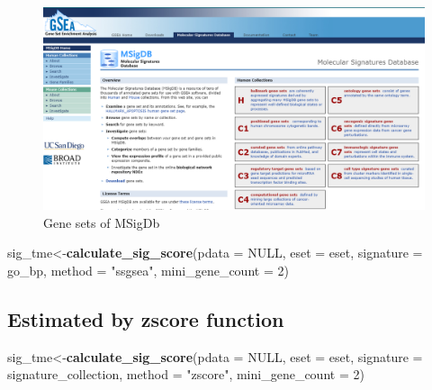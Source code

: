 \documentclass[
  12pt,
]{book}
\newenvironment{Shaded}{\begin{snugshade}}{\end{snugshade}}
\newcommand{\AttributeTok}[1]{\textcolor[rgb]{0.13,0.29,0.53}{#1}}
\newcommand{\ConstantTok}[1]{\textcolor[rgb]{0.56,0.35,0.01}{#1}}
\newcommand{\DecValTok}[1]{\textcolor[rgb]{0.00,0.00,0.81}{#1}}
\newcommand{\FunctionTok}[1]{\textcolor[rgb]{0.13,0.29,0.53}{\textbf{#1}}}
\newcommand{\NormalTok}[1]{#1}
\newcommand{\OtherTok}[1]{\textcolor[rgb]{0.56,0.35,0.01}{#1}}
\newcommand{\StringTok}[1]{\textcolor[rgb]{0.31,0.60,0.02}{#1}}
\begin{document}
\begin{figure}

{\centering \includegraphics[width=0.95\linewidth]{./fig/gsea} 

}

\caption{Gene sets of MSigDb}\label{fig:unnamed-chunk-10}
\end{figure}

\begin{Shaded}
\begin{Highlighting}[]
\NormalTok{sig\_tme}\OtherTok{\textless{}{-}}\FunctionTok{calculate\_sig\_score}\NormalTok{(}\AttributeTok{pdata           =} \ConstantTok{NULL}\NormalTok{,}
                             \AttributeTok{eset            =}\NormalTok{ eset,}
                             \AttributeTok{signature       =}\NormalTok{ go\_bp,}
                             \AttributeTok{method          =} \StringTok{"ssgsea"}\NormalTok{,}
                             \AttributeTok{mini\_gene\_count =} \DecValTok{2}\NormalTok{)}
\end{Highlighting}
\end{Shaded}

\hypertarget{estimated-by-zscore-function}{%
\subsection{Estimated by zscore function}\label{estimated-by-zscore-function}}

\begin{Shaded}
\begin{Highlighting}[]
\NormalTok{sig\_tme}\OtherTok{\textless{}{-}}\FunctionTok{calculate\_sig\_score}\NormalTok{(}\AttributeTok{pdata           =} \ConstantTok{NULL}\NormalTok{,}
                             \AttributeTok{eset            =}\NormalTok{ eset,}
                             \AttributeTok{signature       =}\NormalTok{ signature\_collection,}
                             \AttributeTok{method          =} \StringTok{"zscore"}\NormalTok{,}
                             \AttributeTok{mini\_gene\_count =} \DecValTok{2}\NormalTok{)}
\end{Highlighting}
\end{Shaded}
\end{document}
